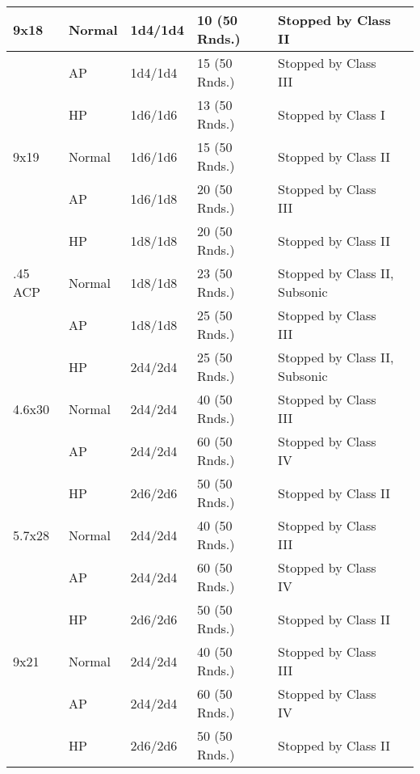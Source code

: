 \begin{table}
\begin{center}
\begin{tabular}{| l | l | l | l | l | l |}
      9x18    & Normal & 1d4/1d4  & 10 (50 Rnds.) & Stopped by Class II \\ \hline
      \,      & AP     & 1d4/1d4  & 15 (50 Rnds.) & Stopped by Class III \\ \hline
      \,      & HP     & 1d6/1d6  & 13 (50 Rnds.) & Stopped by Class I \\ \hline
      9x19    & Normal & 1d6/1d6  & 15 (50 Rnds.) & Stopped by Class II \\ \hline
      \,      & AP     & 1d6/1d8  & 20 (50 Rnds.) & Stopped by Class III \\ \hline
      \,      & HP     & 1d8/1d8  & 20 (50 Rnds.) & Stopped by Class II \\ \hline
      .45 ACP & Normal & 1d8/1d8  & 23 (50 Rnds.) & Stopped by Class II, Subsonic \\ \hline
      \,      & AP     & 1d8/1d8  & 25 (50 Rnds.) & Stopped by Class III \\ \hline
      \,      & HP     & 2d4/2d4  & 25 (50 Rnds.) & Stopped by Class II, Subsonic \\ \hline
      4.6x30  & Normal & 2d4/2d4  & 40 (50 Rnds.) & Stopped by Class III \\ \hline
      \,      & AP     & 2d4/2d4  & 60 (50 Rnds.) & Stopped by Class IV \\ \hline
      \,      & HP     & 2d6/2d6  & 50 (50 Rnds.) & Stopped by Class II \\ \hline
      5.7x28  & Normal & 2d4/2d4  & 40 (50 Rnds.) & Stopped by Class III \\ \hline
      \,      & AP     & 2d4/2d4  & 60 (50 Rnds.) & Stopped by Class IV \\ \hline
      \,      & HP     & 2d6/2d6  & 50 (50 Rnds.) & Stopped by Class II \\ \hline
      9x21    & Normal & 2d4/2d4  & 40 (50 Rnds.) & Stopped by Class III \\ \hline
      \,      & AP     & 2d4/2d4  & 60 (50 Rnds.) & Stopped by Class IV \\ \hline
      \,      & HP     & 2d6/2d6  & 50 (50 Rnds.) & Stopped by Class II \\ \hline

    \end{tabular}
  \end{center}
\end{table}


